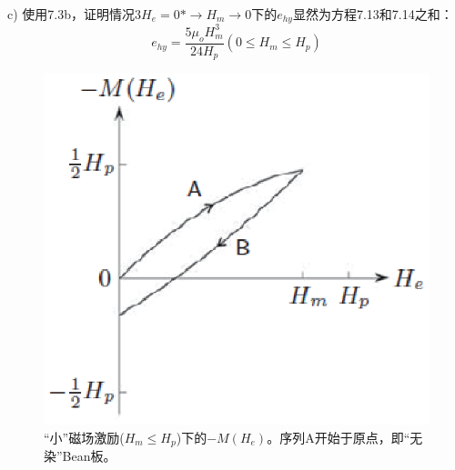 c) 使用7.3b，证明情况3$H_e=0*\rightarrow H_m\rightarrow 0$下的$e_{hy}$显然为方程7.13和7.14之和：
\begin{equation}%
e_{hy}=\frac{5\mu_oH_{m}^{3}}{24H_p}      (0\leq H_m\leq H_p)
\end{equation}
\begin{figure}[htbp]
	\centering
	\includegraphics[scale=0.6]{chpt7/figs/fig7.10.eps}
	\caption{“小”磁场激励($H_m\le H_p$)下的$-M(H_e)$。序列A开始于原点，即“无染”Bean板。}
\end{figure}

